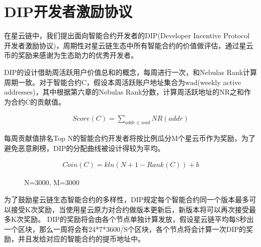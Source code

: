 \section{DIP开发者激励协议}
\label{sec:dip}

在星云链中，我们提出面向智能合约开发者的DIP(Developer Incentive Protocol 开发者激励协议)，周期性对星云链生态中所有智能合约的价值做评估，通过星云币的奖励来感谢为生态助力的优秀开发者。

DIP的设计借助周活跃用户价值总和的概念，每周进行一次，和Nebulas Rank计算周期一致。对于智能合约C，假设本周活跃账户地址集合为wad(weekly active addresses)，其中根据第六章的Nebulas Rank分数，计算周活跃地址的NR之和作为合约C的贡献值。

\begin{align}
Score(C)=\sum_{addr \in wad}NR(addr)
\end{align}

每周贡献值排名Top N的智能合约开发者将按比例瓜分M个星云币作为奖励，为了避免恶意刷榜，DIP的分配曲线被设计得较为平均。

\begin{align}
Coin(C) =kln(N+1-Rank(C))+b
\end{align}

\begin{figure}[htbp] 
\centering
{}
\label{fig:dip}
\caption{N=3000, M=3000}
\end{figure}

为了鼓励星云链生态智能合约的多样性，DIP规定每个智能合约同一个版本最多可以接受K次奖励，当使用星云原力对合约做版本更新后，新版本将可以再次接受最多K次奖励。
DIP的奖励将会由各个节点单独计算发放，假设星云链平均每S秒出一个区块，那么一周将会有24*7*3600/S个区块，各个节点将会计算一次DIP的奖励，并且发给对应的智能合约的提币地址中。
